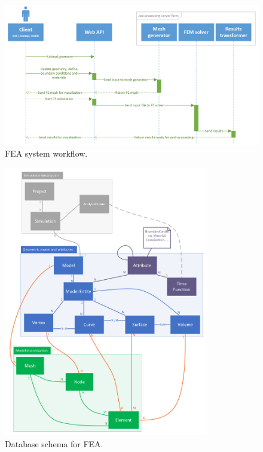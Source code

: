 \begin{figure}[H]
    \centering
    \includegraphics[width=\textwidth]{figures/FEA-workflow}
    \decoRule
    \caption{FEA system workflow.}
    \label{fig:FEA-workflow}
\end{figure}

\begin{figure}[H]
    \centering
    \includegraphics[width=0.8\textwidth]{figures/FEA-database-schema}
    \decoRule
    \caption{Database schema for FEA.}
    \label{fig:FEA-db-schema}
\end{figure}

